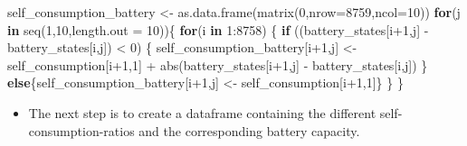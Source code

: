 \documentclass[
]{article}
\newenvironment{Shaded}{\begin{snugshade}}{\end{snugshade}}
\newcommand{\AttributeTok}[1]{\textcolor[rgb]{0.77,0.63,0.00}{#1}}
\newcommand{\ControlFlowTok}[1]{\textcolor[rgb]{0.13,0.29,0.53}{\textbf{#1}}}
\newcommand{\DecValTok}[1]{\textcolor[rgb]{0.00,0.00,0.81}{#1}}
\newcommand{\FunctionTok}[1]{\textcolor[rgb]{0.00,0.00,0.00}{#1}}
\newcommand{\NormalTok}[1]{#1}
\newcommand{\OtherTok}[1]{\textcolor[rgb]{0.56,0.35,0.01}{#1}}
\newcommand{\SpecialCharTok}[1]{\textcolor[rgb]{0.00,0.00,0.00}{#1}}
\providecommand{\tightlist}{%
  \setlength{\itemsep}{0pt}\setlength{\parskip}{0pt}}
\begin{document}
\begin{Shaded}
\begin{Highlighting}[]
\NormalTok{self\_consumption\_battery }\OtherTok{\textless{}{-}} \FunctionTok{as.data.frame}\NormalTok{(}\FunctionTok{matrix}\NormalTok{(}\DecValTok{0}\NormalTok{,}\AttributeTok{nrow=}\DecValTok{8759}\NormalTok{,}\AttributeTok{ncol=}\DecValTok{10}\NormalTok{))}
\ControlFlowTok{for}\NormalTok{(j }\ControlFlowTok{in} \FunctionTok{seq}\NormalTok{(}\DecValTok{1}\NormalTok{,}\DecValTok{10}\NormalTok{,}\AttributeTok{length.out =} \DecValTok{10}\NormalTok{))\{}
  \ControlFlowTok{for}\NormalTok{(i }\ControlFlowTok{in} \DecValTok{1}\SpecialCharTok{:}\DecValTok{8758}\NormalTok{) \{}
    \ControlFlowTok{if}\NormalTok{ ((battery\_states[i}\SpecialCharTok{+}\DecValTok{1}\NormalTok{,j] }\SpecialCharTok{{-}}\NormalTok{ battery\_states[i,j]) }\SpecialCharTok{\textless{}} \DecValTok{0}\NormalTok{) \{}
\NormalTok{      self\_consumption\_battery[i}\SpecialCharTok{+}\DecValTok{1}\NormalTok{,j] }\OtherTok{\textless{}{-}}\NormalTok{ self\_consumption[i}\SpecialCharTok{+}\DecValTok{1}\NormalTok{,}\DecValTok{1}\NormalTok{] }\SpecialCharTok{+} \FunctionTok{abs}\NormalTok{(battery\_states[i}\SpecialCharTok{+}\DecValTok{1}\NormalTok{,j] }\SpecialCharTok{{-}}\NormalTok{ battery\_states[i,j])}
\NormalTok{    \} }\ControlFlowTok{else}\NormalTok{\{self\_consumption\_battery[i}\SpecialCharTok{+}\DecValTok{1}\NormalTok{,j] }\OtherTok{\textless{}{-}}\NormalTok{ self\_consumption[i}\SpecialCharTok{+}\DecValTok{1}\NormalTok{,}\DecValTok{1}\NormalTok{]\}}
\NormalTok{  \}}
\NormalTok{\}}
\end{Highlighting}
\end{Shaded}

\begin{itemize}
\tightlist
\item
  The next step is to create a dataframe containing the different
  self-consumption-ratios and the corresponding battery capacity.
\end{itemize}

\newpage
\end{document}
